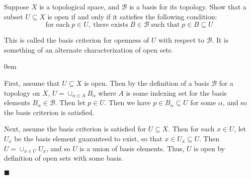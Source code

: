 \documentclass[12pt]{article}
\renewcommand{\qed}{\hfill$\blacksquare$}
\renewenvironment{proof}{\begin{addmargin}[1em]{0em}\begin{newproof}}{\end{newproof}\end{addmargin}\qed}
\newenvironment{exercise}[2][Exercise]{\begin{trivlist}
\item[\hskip \labelsep {\bfseries #1}\hskip \labelsep {\bfseries #2.}]}{\end{trivlist}}
\begin{document}
\begin{exercise}{2.40}
	Suppose $X$ is a topological space, and $\mathcal{B}$ is a basis for its topology. Show that a subset $U\subseteq X$ is open if and only if it satisfies the following condition: \[ \text{for each} \; p\in U, \; \text{there exists}\; B\in \mathcal{B}\; \text{such that} \; p\in B\subseteq U\]
\end{exercise}
{\color{red}This is called the basis criterion for openness of $U$ with respect to $\mathcal{B}$. It is something of an alternate characterization of open sets.}\\
\begin{proof}
First, assume that $U\subseteq X$ is open. Then by the definition of a basis $\mathcal{B}$ for a topology on $X$, $U = \cup_{\alpha \in A} B_{\alpha}$ where $A$ is some indexing set for the basis elements $B_{\alpha}\in \mathcal{B}$. Then let $p\in U$. Then we have $p \in B_{\alpha}\subseteq U$ for some $\alpha$, and so the basis criterion is satisfied.

Next, assume the basis criterion is satisfied for $U\subseteq X$. Then for each $x \in U$, let $U_x$ be the basis element guaranteed to exist, so that $x \in U_x \subseteq U$. Then $U = \cup_{x\in U}U_x$, and so $U$ is a union of basis elements. Thus, $U$ is open by definition of open sets with some basis.
\end{proof}
\end{document}
